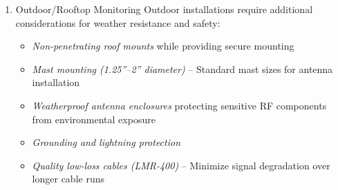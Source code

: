 \documentclass[11pt]{report}
\newcommand{\gc}[1]{\textcolor[rgb]{1.00,0.00,0.00}{#1}}
\newcommand{\blue}[1]{\textcolor[rgb]{0.00,0.00,1.00}{#1}}
\begin{document}
\begin{description}
\begin{enumerate}[label=\roman*)]
\begin{itemize}
	\item{Preselection (filters/attenuators)} \gc{to prevent overload in real-world RF environments}
	\begin{itemize}
		\item FM broadcast notch (88–108 MHz) for near strong broadcast towers.
		\item 
		Bandpass tiles for VHF/UHF, 700–960 MHz, 1.7–2.7 GHz, 3–4 GHz, 4–6 GHz.
	\end{itemize}
	
	\item{Stable timing/clocking} \gc{for coherence, TDOA, and repeatable measurements}
	
	\gc{MIMO sync cable}  For dual-channel phase coherence  \href{https://kb.ettus.com/Synchronization_and_MIMO_Capability_with_USRP_Devices}{$\gc{\bullet}$} \blue{200} \href{https://www.ettus.com/product-categories/cables/}{$\gc{\bullet}$}
	
	GPSDO or an external 10 MHz + PPS reference: improves frequency accuracy, stability, and enables multi-node TDOA geolocation and clean cross-site data fusion.
	
	
	\item{Digitally controlled step attenuator} (e.g., 0–31 dB) placed before the SDR to prevent ADC overload in high-signal environments.
\end{itemize}

\item{Outdoor/Rooftop Monitoring}
Outdoor installations require additional considerations for weather resistance and safety:

\begin{itemize}
	\item \textit{Non-penetrating roof mounts} while providing secure mounting
	\item \textit{Mast mounting (1.25''--2'' diameter)} -- Standard mast sizes for antenna installation
	\item \textit{Weatherproof antenna enclosures} protecting sensitive RF components from environmental exposure
	\item \textit{Grounding and lightning protection} 
	\item \textit{Quality low-loss cables (LMR-400)} -- Minimize signal degradation over longer cable runs
\end{itemize}


\end{enumerate}
\end{description}
\end{document}
